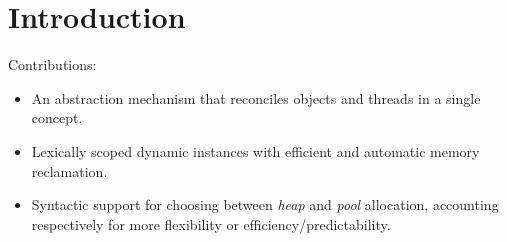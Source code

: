 \documentclass{sig-alternate-ipsn13}
\begin{document}
\section{Introduction}

\begin{comment}
this distinction between data and control data shows that both memory and 
control need to be allocated dynamically.

allocate code dynamically

protothreads / ocram cannot dynamically allocate threads

they should use statically allocated with loops

probls: no composition (as they are global)
        no reuse of memory (because they are alway active)

Dynamic functionality in embedded systems is usually discouraged due to 
resource constraints.
However, some types of applications inherently require memory allocation.

As an example, protocols in sensor networks typically forward messages through nodes at a non-deterministic rate, given that the number of neighbors and transmission periods can vary.
Hence, many protocols require dynamic memory management to hold receiving messages until they are successfully forwarded.

A simple FIFO queue might not be always optimal because forwarding a message may involve multiple steps with delays (e.g. transmission acknowledgments).
In such scenario, the protocol would rather handle multiple messages at the same time, raising the possibility of a message received later be discarded first.
\end{comment}

Contributions:

\begin{itemize}
\item An abstraction mechanism that reconciles objects and threads in a single 
        concept.

\item Lexically scoped dynamic instances with efficient and automatic memory 
        reclamation.

\item Syntactic support for choosing between \emph{heap} and \emph{pool} 
        allocation, accounting respectively for more flexibility or 
efficiency/predictability.
\end{itemize}

\end{document}
